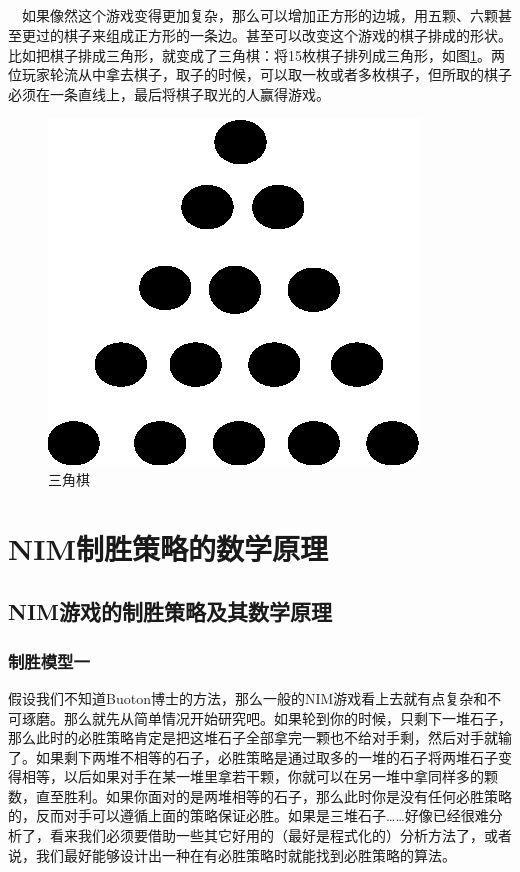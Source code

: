 \documentclass[UTF8,nofonts,cs4size]{ctexrep}
\begin{document}
\paragraph{}
\indent \ \ 
如果像然这个游戏变得更加复杂，那么可以增加正方形的边城，用五颗、六颗甚至更过的棋子来组成正方形的一条边。甚至可以改变这个游戏的棋子排成的形状。比如把棋子排成三角形，就变成了三角棋：将15枚棋子排列成三角形，如图\ref{angle}。两位玩家轮流从中拿去棋子，取子的时候，可以取一枚或者多枚棋子，但所取的棋子必须在一条直线上，最后将棋子取光的人赢得游戏。
\begin{figure}[htp]
\centering
\includegraphics[scale=1]{angle.eps}
\caption{三角棋}
\label{angle}
\end{figure}


\chapter{NIM制胜策略的数学原理}
\section{NIM游戏的制胜策略及其数学原理}
\subsection{制胜模型一}
假设我们不知道Buoton博士的方法，那么一般的NIM游戏看上去就有点复杂和不可琢磨。那么就先从简单情况开始研究吧。如果轮到你的时候，只剩下一堆石子，那么此时的必胜策略肯定是把这堆石子全部拿完一颗也不给对手剩，然后对手就输了。如果剩下两堆不相等的石子，必胜策略是通过取多的一堆的石子将两堆石子变得相等，以后如果对手在某一堆里拿若干颗，你就可以在另一堆中拿同样多的颗数，直至胜利。如果你面对的是两堆相等的石子，那么此时你是没有任何必胜策略的，反而对手可以遵循上面的策略保证必胜。如果是三堆石子……好像已经很难分析了，看来我们必须要借助一些其它好用的（最好是程式化的）分析方法了，或者说，我们最好能够设计出一种在有必胜策略时就能找到必胜策略的算法。
\end{document}
